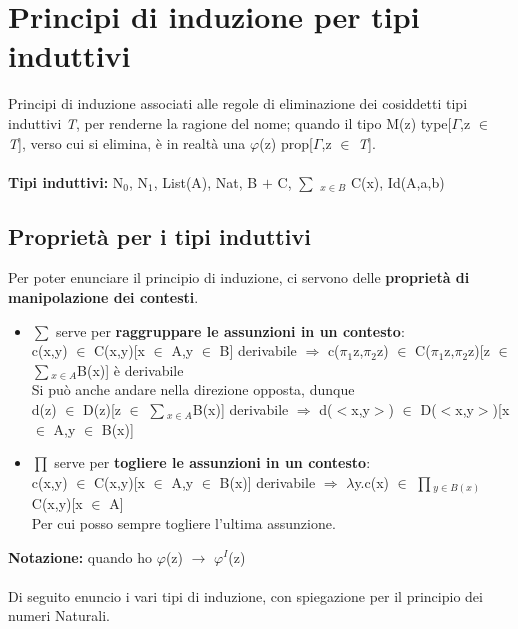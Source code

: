 \chapter{Principi di induzione per tipi induttivi}
\label{cap:principi-di-induzione-per-tipi-induttivi}
Principi di induzione associati alle regole di eliminazione dei cosiddetti tipi induttivi \textit{T}, per renderne la ragione del nome; quando il tipo M(z) type[$\Gamma$,z $\in$ \textit{T}], verso cui si elimina, \`e in realt\`a una $\varphi$(z) prop[$\Gamma$,z $\in$ \textit{T}].\\\\
\noindent
\textbf{Tipi induttivi:} N$_0$, N$_1$, List(A), Nat, B $+$ C, {\scriptsize $\sum$} $_{x \in B}$ C(x), Id(A,a,b)\\

\section{Propriet\`a per i tipi induttivi}
\label{sec:prorieta-per-i-tipi-induttivi}
Per poter enunciare il principio di induzione, ci servono delle \textbf{propriet\`a di manipolazione dei contesti}.
\begin{itemize}
\item {\scriptsize $\sum$} serve per \textbf{raggruppare le assunzioni in un contesto}:\\
c(x,y) $\in$ C(x,y)[x $\in$ A,y $\in$ B] derivabile $\Rightarrow$ c($\pi_1$z,$\pi_2$z) $\in$ C($\pi_1$z,$\pi_2$z)[z $\in$ {\scriptsize $\sum\limits$}$_{x \in A}$B(x)] \`e derivabile\\
Si pu\`o anche andare nella direzione opposta, dunque\\
d(z) $\in$ D(z)[z $\in$ {\scriptsize $\sum\limits$}$_{x \in A}$B(x)] derivabile $\Rightarrow$ d($<$x,y$>$) $\in$  D($<$x,y$>$)[x $\in$ A,y $\in$ B(x)]
\item {\scriptsize $\prod$} serve per \textbf{togliere le assunzioni in un contesto}:\\
c(x,y) $\in$ C(x,y)[x $\in$ A,y $\in$ B(x)] derivabile $\Rightarrow$ $\lambda$y.c(x) $\in$ {\scriptsize $\prod$}$_{y \in B(x)}$C(x,y)[x $\in$ A]\\
Per cui posso sempre togliere l'ultima assunzione.
\end{itemize}
\noindent
\textbf{Notazione:} quando ho $\varphi$(z) $\rightarrow$ $\varphi^I$(z) \\\\

\noindent
Di seguito enuncio i vari tipi di induzione, con spiegazione per il principio dei numeri Naturali.
